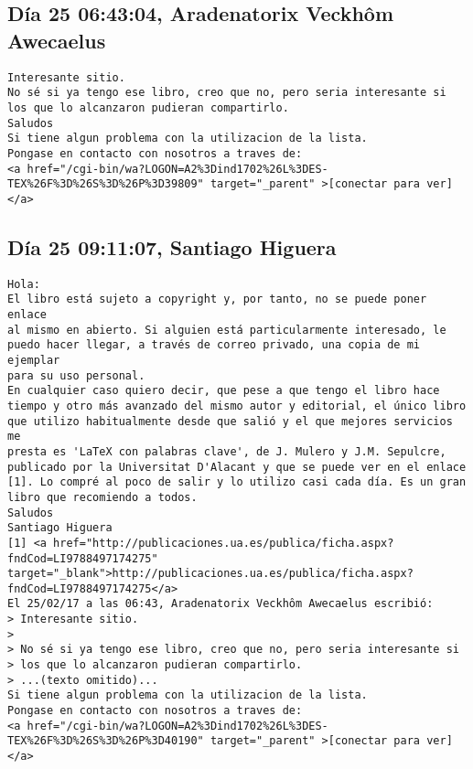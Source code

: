 \documentclass[a4paper,10pt]{article}
\begin{document}
\subsection{Día 25 06:43:04, Aradenatorix Veckhôm Awecaelus}

\begin{lstlisting}
Interesante sitio.
No sé si ya tengo ese libro, creo que no, pero seria interesante si
los que lo alcanzaron pudieran compartirlo.
Saludos
Si tiene algun problema con la utilizacion de la lista.
Pongase en contacto con nosotros a traves de:
<a href="/cgi-bin/wa?LOGON=A2%3Dind1702%26L%3DES-TEX%26F%3D%26S%3D%26P%3D39809" target="_parent" >[conectar para ver]</a>

\end{lstlisting}

\subsection{Día 25 09:11:07, Santiago Higuera}

\begin{lstlisting}
Hola:
El libro está sujeto a copyright y, por tanto, no se puede poner enlace 
al mismo en abierto. Si alguien está particularmente interesado, le 
puedo hacer llegar, a través de correo privado, una copia de mi ejemplar 
para su uso personal.
En cualquier caso quiero decir, que pese a que tengo el libro hace 
tiempo y otro más avanzado del mismo autor y editorial, el único libro 
que utilizo habitualmente desde que salió y el que mejores servicios me 
presta es 'LaTeX con palabras clave', de J. Mulero y J.M. Sepulcre, 
publicado por la Universitat D'Alacant y que se puede ver en el enlace 
[1]. Lo compré al poco de salir y lo utilizo casi cada día. Es un gran 
libro que recomiendo a todos.
Saludos
Santiago Higuera
[1] <a href="http://publicaciones.ua.es/publica/ficha.aspx?fndCod=LI9788497174275" target="_blank">http://publicaciones.ua.es/publica/ficha.aspx?fndCod=LI9788497174275</a>
El 25/02/17 a las 06:43, Aradenatorix Veckhôm Awecaelus escribió:
> Interesante sitio.
>
> No sé si ya tengo ese libro, creo que no, pero seria interesante si
> los que lo alcanzaron pudieran compartirlo.
> ...(texto omitido)...
Si tiene algun problema con la utilizacion de la lista.
Pongase en contacto con nosotros a traves de:
<a href="/cgi-bin/wa?LOGON=A2%3Dind1702%26L%3DES-TEX%26F%3D%26S%3D%26P%3D40190" target="_parent" >[conectar para ver]</a>

\end{lstlisting}
\end{document}
